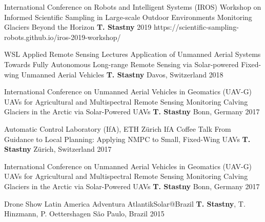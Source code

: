 \label{sec:talks}

\begin{cventries}

\cvtalkentry
	{International Conference on Robots and Intelligent Systems (IROS)} %
	{Workshop on Informed Scientific Sampling in Large-scale Outdoor Environments} %
	{Monitoring Glaciers Beyond the Horizon} %
	{\textbf{T. Stastny}} %
	{} %
	{2019} %
	{https://scientific-sampling-robots.github.io/iros-2019-workshop/} %
	
\cvtalkentry
	{WSL Applied Remote Sensing Lectures} %
	{Application of Unmanned Aerial Systems} %
	{Towards Fully Autonomous Long-range Remote Sensing via Solar-powered Fixed-wing Unmanned Aerial Vehicles} %
	{\textbf{T. Stastny}} %
	{Davos, Switzerland} %
	{2018} %
	{} %

\vspace*{-10pt}
\cvtalkentry
	{International Conference on Unmanned Aerial Vehicles in Geomatics (UAV-G)} %
	{UAVs for Agricultural and Multispectral Remote Sensing} %
	{Monitoring Calving Glaciers in the Arctic via Solar-Powered UAVs} %
	{\textbf{T. Stastny}} %
	{Bonn, Germany} %
	{2017} %
	{} %
		
\vspace*{-10pt}	
\cvtalkentry
	{Automatic Control Laboratory (IfA), ETH Z\"{u}rich} %
	{IfA Coffee Talk} %
	{From Guidance to Local Planning: Applying NMPC to Small, Fixed-Wing UAVs} %
	{\textbf{T. Stastny}} %
	{Z\"{u}rich, Switzerland} %
	{2017} %
	{} %
		
\vspace*{-10pt}
\cvtalkentry
	{International Conference on Unmanned Aerial Vehicles in Geomatics (UAV-G)} %
	{UAVs for Agricultural and Multispectral Remote Sensing} %
	{Monitoring Calving Glaciers in the Arctic via Solar-Powered UAVs} %
	{\textbf{T. Stastny}} %
	{Bonn, Germany} %
	{2017} %
	{} %
		
\vspace*{-10pt}
\cvtalkentry
	{Drone Show Latin America} %
	{} %
	{Adventura AtlantikSolar@Brazil} %
	{\textbf{T. Stastny}, T. Hinzmann, P. Oettershagen} %
	{S\~{a}o Paulo, Brazil} %
	{2015} %
	{} %

\end{cventries}
